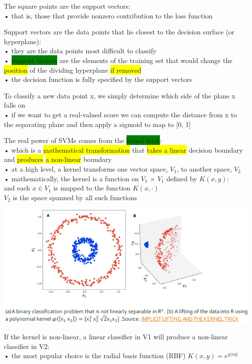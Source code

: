 \documentclass[]{project_plan}
\begin{document}
The square points are the support vectors:\\
• that is, those that provide nonzero contribution to the loss function

Support vectors are the data points that lie closest to the decision surface (or
hyperplane):\\
• they are the data points most difficult to classify\\
• \colorbox{green}{support vectors} are the elements of the training set that would change the
\colorbox{yellow}{position} of the dividing hyperplane \colorbox{yellow}{if removed}\\
• the decision function is fully specified by the support vectors

To classify a new data point x, we simply determine which side of the plane x falls on\\
• if we want to get a real-valued score we can compute the distance from x to the
separating plane and then apply a sigmoid to map to [0, 1]

The real power of SVMs comes from the \colorbox{green}{kernel trick}:\\
• which is a \colorbox{yellow}{mathematical transformation} that \colorbox{yellow}{takes a linear} decision boundary and
\colorbox{yellow}{produces} \colorbox{yellow}{a non-linear} boundary\\
• at a high level, a kernel transforms one vector space, $V_1$, to another space, $V_2$\\
• mathematically, the kernel is a function on $V_1$ × $V_1$ defined by $K(x, y)$:\\
and each $x \in V_1$ is mapped to the function $K(x, \cdot)$\\
$V_2$ is the space spanned by all such functions

\includegraphics[width=.9\linewidth]{ml87.png}

If the kernel is non-linear, a linear classifier in V1 will produce a non-linear
classifier in V2:\\
• the most popular choice is the radial basis function (RBF) $K(x, y) = e^{y|xy|}$
\end{document}
